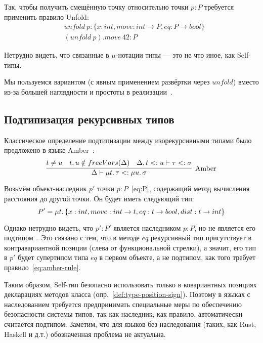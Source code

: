 Так, чтобы получить смещённую точку относительно точки $p : P$ требуется применить правило Unfold:
\begin{align*}
    &unfold~p : \{ x : int, move : int \to P, eq : P \to bool \} \\
    &(unfold~p).move~42 : P
\end{align*}

Нетрудно видеть, что связанные в $\mu$-нотации типы --- это не что иное, как Self-типы.

Мы пользуемся вариантом  (с явным применением развёртки через $unfold$) вместо  из-за большей наглядности и простоты в реализации~\cite{pierce2002types}.


\subsection{Подтипизация рекурсивных типов}

Классическое определение подтипизации между изорекурсивными типами было предложено в языке Amber~\cite{cardelli2005amber}:
\begin{equation}
    \label{eq:amber-rule}
    \infer[\text{Amber}]{
        \Delta \vdash \mu t \ldotp \tau <: \mu u \ldotp \sigma
    }{
        t \neq u & t, u \notin freeVars(\Delta) & \Delta, t <: u \vdash \tau <: \sigma
    }
\end{equation}

Возьмём объект-наследник $p'$ точки $p : P$~\eqref{eq:P}, содержащий метод вычисления расстояния до другой точки.
Он будет иметь следующий тип:
\begin{equation}
    \label{eq:P'}
    P' = \mu t \ldotp \{ x : int, move : int \to t, eq : t \to bool, dist : t \to int \}
\end{equation}

Однако нетрудно видеть, что $p' : P'$ является наследником $p : P$, но не является его подтипом~\cite{cook1989inheritance}.
Это связано с тем, что в методе $eq$ рекурсивный тип присутствует в контравариантной позиции (слева от функциональной стрелки), а значит, его тип в $p'$ будет супертипом типа $eq$ в первом объекте, а не подтипом, как того требует правило~\eqref{eq:amber-rule}.

Таким образом, Self-тип безопасно использовать только в ковариантных позициях декларациях методов класса (опр.~\ref{def:type-position-sign}).
Поэтому в языках с наследованием требуется предпринимать специальные меры по обеспечению безопасности системы типов, так как наследник, как правило, автоматически считается подтипом.
Заметим, что для языков без наследования (таких, как Rust, Haskell и д.т.) обозначенная проблема не актуальна.


